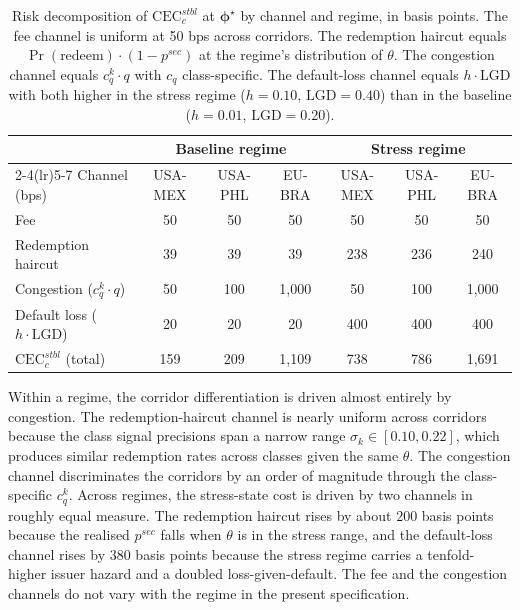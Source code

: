 \begin{table}[h]
\centering
\caption{Risk decomposition of $\mathrm{CEC}^{stbl}_c$ at $\boldsymbol{\phi}^\star$ by channel and regime, in basis points. The fee channel is uniform at 50 bps across corridors. The redemption haircut equals $\Pr(\text{redeem}) \cdot (1 - p^{sec})$ at the regime's distribution of $\theta$. The congestion channel equals $c_q^k \cdot q$ with $c_q$ class-specific. The default-loss channel equals $h \cdot \mathrm{LGD}$ with both higher in the stress regime ($h = 0.10$, $\mathrm{LGD} = 0.40$) than in the baseline ($h = 0.01$, $\mathrm{LGD} = 0.20$).}
\label{tab:cb_decomp}
\small
\begin{tabular}{lcccccc}
\toprule
& \multicolumn{3}{c}{Baseline regime} & \multicolumn{3}{c}{Stress regime} \\
\cmidrule(lr){2-4}\cmidrule(lr){5-7}
Channel (bps) & USA-MEX & USA-PHL & EU-BRA & USA-MEX & USA-PHL & EU-BRA \\
\midrule
Fee & 50 & 50 & 50 & 50 & 50 & 50 \\
Redemption haircut & 39 & 39 & 39 & 238 & 236 & 240 \\
Congestion ($c_q^k \cdot q$) & 50 & 100 & 1{,}000 & 50 & 100 & 1{,}000 \\
Default loss ($h \cdot \mathrm{LGD}$) & 20 & 20 & 20 & 400 & 400 & 400 \\
\midrule
$\mathrm{CEC}^{stbl}_c$ (total) & 159 & 209 & 1{,}109 & 738 & 786 & 1{,}691 \\
\bottomrule
\end{tabular}
\end{table}

Within a regime, the corridor differentiation is driven almost entirely by congestion. The redemption-haircut channel is nearly uniform across corridors because the class signal precisions span a narrow range $\sigma_k \in [0.10, 0.22]$, which produces similar redemption rates across classes given the same $\theta$. The congestion channel discriminates the corridors by an order of magnitude through the class-specific $c_q^k$. Across regimes, the stress-state cost is driven by two channels in roughly equal measure. The redemption haircut rises by about $200$ basis points because the realised $p^{sec}$ falls when $\theta$ is in the stress range, and the default-loss channel rises by $380$ basis points because the stress regime carries a tenfold-higher issuer hazard and a doubled loss-given-default. The fee and the congestion channels do not vary with the regime in the present specification.

